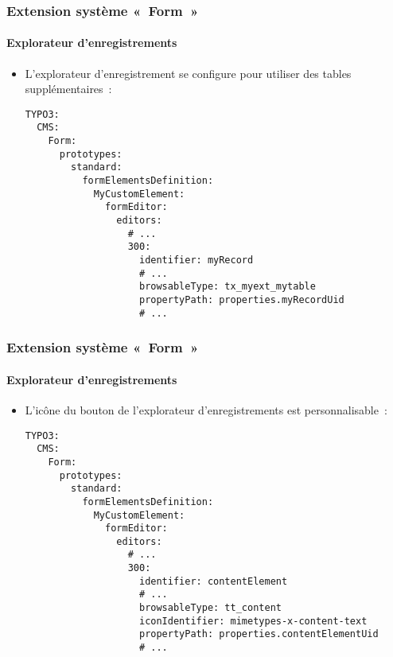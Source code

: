 
\begin{frame}[fragile]
	\frametitle{Extension système «~Form~»}
	\framesubtitle{Explorateur d'enregistrements}

	\lstset{basicstyle=\tiny\ttfamily}

	\begin{itemize}
		\item L'explorateur d'enregistrement se configure pour utiliser des tables supplémentaires~:
\begin{lstlisting}
TYPO3:
  CMS:
    Form:
      prototypes:
        standard:
          formElementsDefinition:
            MyCustomElement:
              formEditor:
                editors:
                  # ...
                  300:
                    identifier: myRecord
                    # ...
                    browsableType: tx_myext_mytable
                    propertyPath: properties.myRecordUid
                    # ...
\end{lstlisting}

	\end{itemize}

\end{frame}


\begin{frame}[fragile]
	\frametitle{Extension système «~Form~»}
	\framesubtitle{Explorateur d'enregistrements}

	\lstset{basicstyle=\tiny\ttfamily}

	\begin{itemize}
		\item L'icône du bouton de l'explorateur d'enregistrements est personnalisable~:
\begin{lstlisting}
TYPO3:
  CMS:
    Form:
      prototypes:
        standard:
          formElementsDefinition:
            MyCustomElement:
              formEditor:
                editors:
                  # ...
                  300:
                    identifier: contentElement
                    # ...
                    browsableType: tt_content
                    iconIdentifier: mimetypes-x-content-text
                    propertyPath: properties.contentElementUid
                    # ...
\end{lstlisting}

	\end{itemize}

\end{frame}

